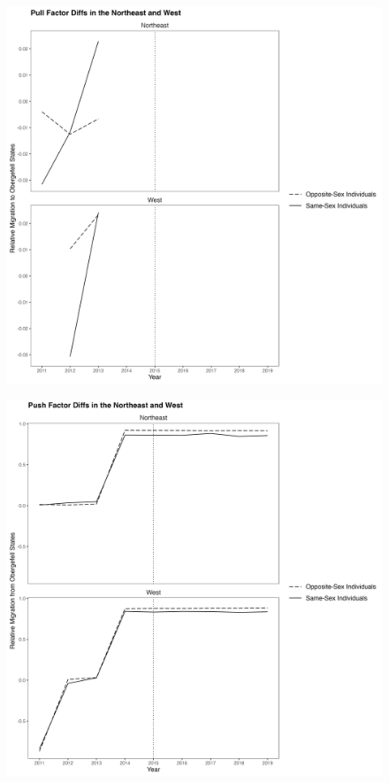 \documentclass[12pt,letterpaper]{article}
\begin{document}
\begin{figure}[htbp]
    \centering
    \includegraphics[width=1\linewidth]{outputs/summary_stats/region_post_diffs_app.png}
    \caption{}
    \label{fig: region_post_diffs_app}
\end{figure}

\begin{figure}[htbp]
    \centering
    \includegraphics[width=1\linewidth]{outputs/summary_stats/region_ante_diffs_app.png}
    \caption{}
    \label{fig: region_ante_diffs_app}
\end{figure}
\end{document}

